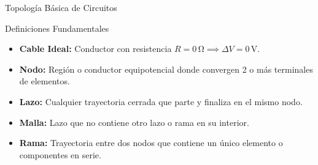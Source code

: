 \documentclass[10pt, aspectratio=169, handout]{beamer}
\begin{document}
\begin{frame}{Topología Básica de Circuitos}
    \begin{boxTeoria}{Definiciones Fundamentales}
        \pause
        \begin{itemize}
            \item<1-> \textbf{Cable Ideal:} Conductor con resistencia $R = 0\,\unit{\ohm} \implies \Delta V = 0\,\mathrm{V}$.
            \item<2-> \textbf{Nodo:} Región o conductor equipotencial donde convergen 2 o más terminales de elementos.
            \item<3-> \textbf{Lazo:} Cualquier trayectoria cerrada que parte y finaliza en el mismo nodo.
            \item <4-> \textbf{Malla:} Lazo que no contiene otro lazo o rama en su interior.
            \item<5-> \textbf{Rama:} Trayectoria entre dos nodos que contiene un único elemento o componentes en serie.
        \end{itemize}
    \end{boxTeoria}

\end{frame}
\end{document}
